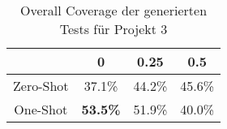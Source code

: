 \bgroup
\def\arraystretch{2}
\begin{table}[H]
	\vspace{.5cm}
	\centering		
	\begin{center}
		\begin{tabular}{|c||c|c|c|}
			\hline 
			& 0 & 0.25 & 0.5 \\
			\hline 
			\hline
			Zero-Shot & 37.1\% & 44.2\% & 45.6\% \\
			\hline
			One-Shot & \textbf{53.5\%} & 51.9\% & 40.0\% \\
			\hline
		\end{tabular} 
	\end{center}
	\caption{Overall Coverage der generierten Tests für Projekt 3}
	\label{fig:o-3}
	\vspace{-.8cm}
\end{table}
\egroup